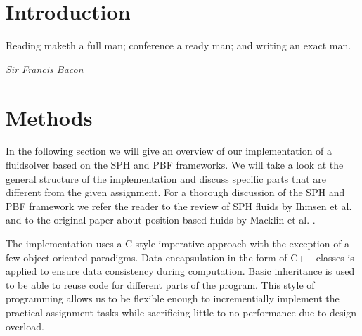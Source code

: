 \documentclass[11pt, letterpaper, twocolumn]{article}
\begin{document}


\section*{Introduction} \label{sec:introduction}

\epigraph{Reading maketh a full man; conference a ready man; and writing an exact man.}
{\textit{Sir Francis Bacon}}


\section*{Methods} \label{sec:methods}

In the following section we will give an overview of our implementation of a fluidsolver based on the SPH and PBF frameworks.
We will take a look at the general structure of the implementation and discuss specific parts that are different from the given assignment.
For a thorough discussion of the SPH and PBF framework we refer the reader to the review of SPH fluids by Ihmsen et al. \cite{ihmsen2014} and to the original paper about position based fluids by Macklin et al. \cite{macklin2013}.

The implementation uses a C-style imperative approach with the exception of a few object oriented paradigms. Data encapsulation in the form of C++ classes is applied to ensure data consistency during computation. Basic inheritance is used to be able to reuse code for different parts of the program. This style of programming allows us to be flexible enough to incrementially implement the practical assignment tasks while sacrificing little to no performance due to design overload.  
\end{document}
